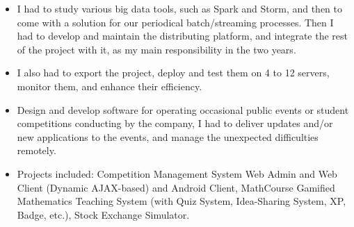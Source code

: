 \documentclass[10pt,a4paper]{altacv}
\begin{document}
           

\divider

\begin{itemize}
\item I had to study various big data tools, such as Spark and Storm, and then to come with a solution for our periodical batch/streaming processes. Then I had to develop and maintain the distributing platform, and integrate the rest of the project with it, as my main responsibility in the two years.
\item I also had to export the project, deploy and test them on 4 to 12 servers, monitor them, and enhance their efficiency.
\end{itemize}

            

\divider


\begin{itemize}
\item Design and develop software for operating occasional public events or student competitions conducting by the company, I had to deliver updates and/or new applications to the events, and manage the unexpected difficulties remotely.
\item Projects included: Competition Management System Web Admin and Web Client (Dynamic AJAX-based) and Android Client, MathCourse Gamified Mathematics Teaching System (with Quiz System, Idea-Sharing System, XP, Badge, etc.), Stock Exchange Simulator.
\end{itemize}

      



\end{document}
